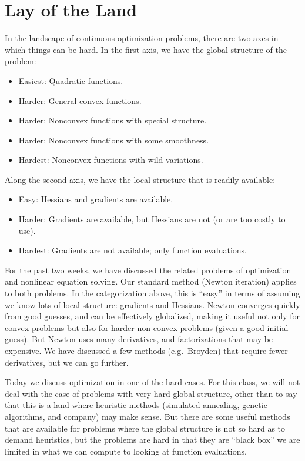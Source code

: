 \documentclass[12pt, leqno]{article} %
\begin{document}

\section{Lay of the Land}

In the landscape of continuous optimization problems, there are
two axes in which things can be hard.  In the first axis,
we have the global structure of the problem:
\begin{itemize}
\item
  Easiest: Quadratic functions.
\item
  Harder: General convex functions.
\item
  Harder: Nonconvex functions with special structure.
\item
  Harder: Nonconvex functions with some smoothness.
\item
  Hardest: Nonconvex functions with wild variations.
\end{itemize}
Along the second axis, we have the local structure that is
readily available:
\begin{itemize}
\item
  Easy: Hessians and gradients are available.
\item
  Harder: Gradients are available, but Hessians are not (or are too
  costly to use).
\item
  Hardest: Gradients are not available; only function evaluations.
\end{itemize}

For the past two weeks, we have discussed the related problems of
optimization and nonlinear equation solving.  Our standard method
(Newton iteration) applies to both problems.  In the categorization
above, this is ``easy'' in terms of assuming we know lots of local
structure: gradients and Hessians.  Newton converges quickly
from good guesses, and can be effectively globalized, making it
useful not only for convex problems but also for harder non-convex
problems (given a good initial guess).  But Newton uses
many derivatives, and factorizations that may be expensive.  We
have discussed a few methods (e.g.~Broyden) that require fewer
derivatives, but we can go further.

Today we discuss optimization in one of the hard cases.  For this
class, we will not deal with the case of problems with very hard
global structure, other than to say that this is a land where
heuristic methods (simulated annealing, genetic algorithms, and
company) may make sense.  But there are some useful methods that are
available for problems where the global structure is not so hard as to
demand heuristics, but the problems are hard in that they are ``black
box'' we are limited in what we can compute to looking at function
evaluations.
\end{document}
